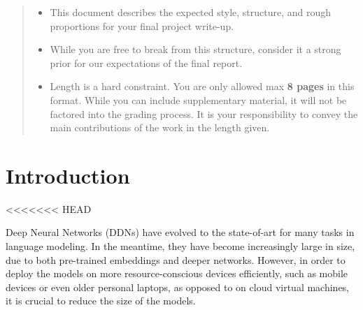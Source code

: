 \documentclass[10pt]{article}
\begin{document}

\begin{abstract}
  \begin{itemize}
  \item This document describes the expected style, structure, and rough
  proportions for your final project write-up.
  \item While you are free to break from this structure, consider it a strong
  prior for our expectations of the final report.
  \item Length is a hard constraint. You are only allowed max \textbf{8 pages}
  in this format. While you can include supplementary material, it will not be
  factored into the grading process. It is your responsibility to convey the
  main contributions of the work in the length given.
  \end{itemize}



\end{abstract}

\section{Introduction}
\label{sec:introduction}

<<<<<<< HEAD

Deep Neural Networks (DDNs) have evolved to the state-of-art for many tasks in
language modeling. In the meantime, they have become increasingly large in
size, due to both pre-trained embeddings and deeper networks. However, in
order to deploy the models on more resource-conscious devices efficiently,
such as mobile devices or even older personal laptops, as opposed to on cloud
virtual machines, it is crucial to reduce the size of the models.
\end{document}
